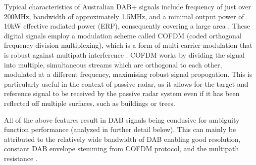 \documentclass[12pt,a4paper]{article}
\begin{document}
\par \vspace{0.5cm} 
\noindent Typical characteristics of Australian DAB+ signals include frequency of just over 200MHz, bandwidth of approximately 1.5MHz, and a minimal output power of 10kW effective radiated power (ERP), consequently covering a large area \cite{DABfeatures}. These digital signals employ a modulation scheme called COFDM (coded orthogonal frequency division multiplexing), which is a form of multi-carrier modulation that is robust against multipath interference \cite{INTRO2017}. COFDM works by dividing the signal into multiple, simultaneous streams which are orthogonal to each other, modulated at a different frequency, maximising robust signal propogation. This is particularly useful in the context of passive radar, as it allows for the target and reference signal to be received by the passive radar system even if it has been reflected off multiple surfaces, such as buildings or trees.

\par \vspace{0.5cm} 
\noindent All of the above features result in DAB signals being condusive for ambiguity function performance (analyzed in further detail below). This can mainly be attributed to the relatively wide bandwidth of DAB enabling good resolution, constant DAB envelope stemming from COFDM protocol, and the multipath resistance \cite{DABambiguity}.
\end{document}
